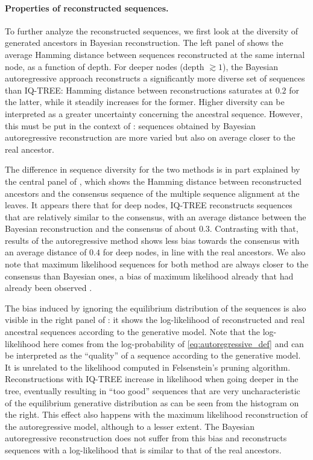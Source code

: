 \paragraph*{Properties of reconstructed sequences.} To further analyze the reconstructed sequences, we first look at the diversity of generated ancestors in Bayesian reconstruction. 
The left panel of  shows the average Hamming distance between sequences reconstructed at the same internal node, as a function of depth. 
For deeper nodes (depth $\gtrsim 1$), the Bayesian autoregressive approach reconstructs a significantly more diverse set of sequences than IQ-TREE: Hamming distance between reconstructions saturates at $0.2$ for the latter, while it steadily increases for the former. 
Higher diversity can be interpreted as a greater uncertainty concerning the ancestral sequence. 
However, this must be put in the context of : sequences obtained by Bayesian autoregressive reconstruction are more varied but also on average closer to the real ancestor. 

The difference in sequence diversity for the two methods is in part explained by the central panel of , which shows the Hamming distance between reconstructed ancestors and the consensus sequence of the multiple sequence alignment at the leaves. 
It appears there that for deep nodes, IQ-TREE reconstructs sequences that are relatively similar to the consensus, with an average distance between the Bayesian reconstruction and the consensus of about $0.3$. 
Contrasting with that, results of the autoregressive method shows less bias towards the consensus with an average distance of $0.4$ for deep nodes, in line with the real ancestors. 
We also note that maximum likelihood sequences for both method are always closer to the consensus than Bayesian ones, a bias of maximum likelihood already that had already been observed \cite{williams_assessingaccuracyancestral_2006}. 

The bias induced by ignoring the equilibrium distribution of the sequences is also visible in the right panel of : it shows the log-likelihood of reconstructed and real ancestral sequences according to the generative model. 
Note that the log-likelihood here comes from the log-probability of \eqref{eq:autoregressive_def} and can be interpreted as the ``quality'' of a sequence according to the generative model. 
It is unrelated to the likelihood computed in Felsenstein's pruning algorithm. 
Reconstructions with IQ-TREE increase in likelihood when going deeper in the tree, eventually resulting in ``too good'' sequences that are very uncharacteristic of the equilibrium generative distribution as can be seen from the histogram on the right. 
This effect also happens with the maximum likelihood reconstruction of the autoregressive model, although to a lesser extent. 
The Bayesian autoregressive reconstruction does not suffer from this bias and reconstructs sequences with a log-likelihood that is similar to that of the real ancestors. \\

